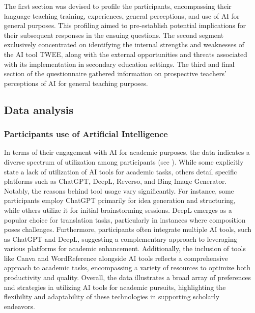 The first section was devised to profile the participants, encompassing
their language teaching training, experiences, general perceptions, and
use of AI for general purposes. This profiling aimed to pre-establish
potential implications for their subsequent responses in the ensuing
questions. The second segment exclusively concentrated on identifying
the internal strengths and weaknesses of the AI tool TWEE, along with
the external opportunities and threats associated with its
implementation in secondary education settings. The third and final
section of the questionnaire gathered information on prospective
teachers' perceptions of AI for general teaching
purposes.

\subsection{Data analysis}\label{sub-sec-dataanalysis}
\subsubsection{Participants use of Artificial Intelligence}\label{sub-sub-sec-participantsuseof}

In terms of their engagement with AI for academic purposes, the data
indicates a diverse spectrum of utilization among participants (see
). While some explicitly state a lack of utilization of AI tools
for academic tasks, others detail specific platforms such as ChatGPT,
DeepL, Reverso, and Bing Image Generator. Notably, the reasons behind
tool usage vary significantly. For instance, some participants employ
ChatGPT primarily for idea generation and structuring, while others
utilize it for initial brainstorming sessions. DeepL emerges as a
popular choice for translation tasks, particularly in instances where
composition poses challenges. Furthermore, participants often integrate
multiple AI tools, such as ChatGPT and DeepL, suggesting a complementary
approach to leveraging various platforms for academic enhancement.
Additionally, the inclusion of tools like Canva and WordReference
alongside AI tools reflects a comprehensive approach to academic tasks,
encompassing a variety of resources to optimize both productivity and
quality. Overall, the data illustrates a broad array of preferences and
strategies in utilizing AI tools for academic pursuits, highlighting the
flexibility and adaptability of these technologies in supporting
scholarly endeavors.

